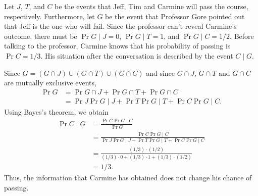 Let $J$, $T$, and $C$ be the events that Jeff, Tim and Carmine will pass the course, respectively.
Furthermore, let $G$ be the event that Professor Gore pointed out that Jeff is the one who will fail.
Since the professor can't reveal Carmine's outcome, there must be $\Pr{G\mid J}=0$, $\Pr{G\mid T}=1$, and $\Pr{G\mid C}=1/2$.
Before talking to the professor, Carmine knows that his probability of passing is $\Pr{C}=1/3$.
His situation after the conversation is described by the event $C\mid G$.

Since $G=(G\cap J)\cup(G\cap T)\cup(G\cap C)$ and since $G\cap J$, $G\cap T$ and $G\cap C$ are mutually exclusive events,
\begin{align*}
    \Pr{G} &= \Pr{G\cap J}+\Pr{G\cap T}+\Pr{G\cap C} \\
    &= \Pr{J}\Pr{G\mid J}+\Pr{T}\Pr{G\mid T}+\Pr{C}\Pr{G\mid C}.
\end{align*}
Using Bayes's theorem, we obtain
\begin{align*}
    \Pr{C\mid G} &= \frac{\Pr{C}\Pr{G\mid C}}{\Pr{G}} \\
    &= \frac{\Pr{C}\Pr{G\mid C}}{\Pr{J}\Pr{G\mid J}+\Pr{T}\Pr{G\mid T}+\Pr{C}\Pr{G\mid C}} \\[2mm]
    &= \frac{(1/3)\cdot(1/2)}{(1/3)\cdot0+(1/3)\cdot1+(1/3)\cdot(1/2)} \\[1mm]
    &= 1/3.
\end{align*}
Thus, the information that Carmine has obtained does not change his chance of passing.
